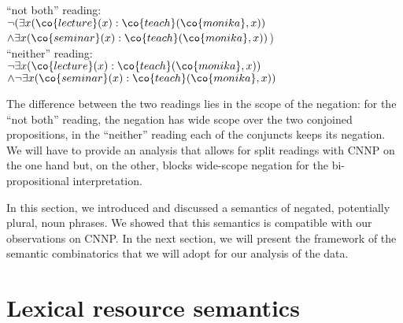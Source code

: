 \documentclass[output=paper]{langsci/langscibook}
\begin{document}
\ea \label{lf-notboth}\label{lf-neither}
\begin{xlist}
\ex 
``not both'' reading:\\ 
\hspace*{-1.5em}
$\lnot (\exists x (\co{lecture}(x) : \co{teach}(\co{monika},x))$\\
\hspace*{1em}$
\land \exists x (\co{seminar}(x) : \co{teach}(\co{monika},x))$)\\
\ex ``neither'' reading:\\ 
\hspace*{-1.5em}
$\lnot \exists x (\co{lecture}(x) : \co{teach}(\co{monika},x))$\\
\hspace*{1em}$
\land \lnot \exists x (\co{seminar}(x) : \co{teach}(\co{monika},x))$
\end{xlist}
\z 

\begin{sloppypar}
  The difference between the two readings lies in the scope of the
  negation: for the ``not both'' reading, the negation has wide scope
  over the two conjoined propositions, in the ``neither'' reading each
  of the conjuncts keeps its negation. We will have to provide an
  analysis that allows for split readings with CNNP on the one hand
  but, on the other, blocks wide-scope negation for the
  bi-propositional interpretation.
\end{sloppypar}

In this section, we introduced and discussed a semantics of negated, potentially plural, noun phrases. We showed that this semantics is  compatible with our observations on  CNNP. 
In the next section, we will present the framework  of the semantic combinatorics that we will adopt for our analysis of the data.

\section{Lexical resource semantics}\label{Sec-LRS}\largerpage
\end{document}
